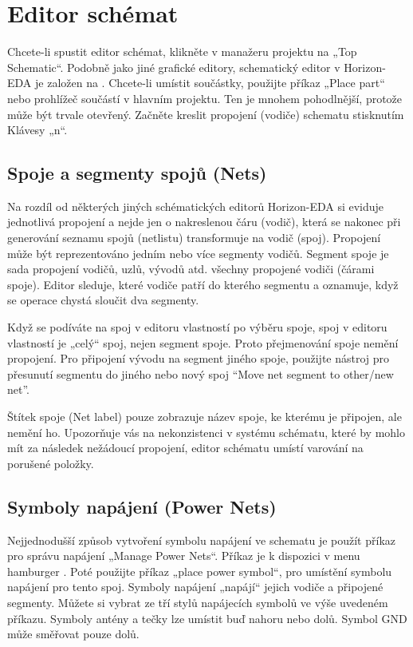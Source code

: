 \documentclass[letterpaper,10pt,czech]{sphinxmanual}
\let\sphinxpxdimen\pdfpxdimen\else\newdimen\sphinxpxdimen
\begin{document}
\chapter{Editor schémat}
\label{\detokenize{imp-sch:editor-schemat}}\label{\detokenize{imp-sch::doc}}
Chcete-li spustit editor schémat, klikněte v manažeru projektu na „Top Schematic“. Podobně jako jiné grafické editory, schematický editor v Horizon-EDA je založen na . Chcete-li umístit součástky, použijte příkaz „Place part“ nebo prohlížeč součástí v hlavním projektu. Ten je mnohem pohodlnější, protože může být trvale otevřený. Začněte kreslit propojení (vodiče) schematu stisknutím Klávesy „n“.


\section{Spoje a segmenty spojů (Nets)}
\label{\detokenize{imp-sch:spoje-a-segmenty-spoju-nets}}
Na rozdíl od některých jiných schématických editorů Horizon-EDA si eviduje jednotlivá propojení a nejde jen o nakreslenou čáru (vodič), která se nakonec při generování seznamu spojů (netlistu) transformuje na vodič (spoj). Propojení může být reprezentováno jedním nebo více segmenty vodičů. Segment spoje je sada propojení vodičů, uzlů, vývodů atd. všechny propojené vodiči (čárami spoje). Editor sleduje, které vodiče patří do kterého segmentu a oznamuje, když se operace chystá sloučit dva segmenty.

Když se podíváte na spoj v editoru vlastností po výběru spoje, spoj v editoru vlastností je „celý“ spoj, nejen segment spoje. Proto přejmenování spoje nemění propojení. Pro připojení vývodu na segment jiného spoje, použijte nástroj pro přesunutí segmentu do jiného nebo nový spoj “Move net segment to other/new net”.

Štítek spoje (Net label) pouze zobrazuje název spoje, ke kterému je připojen, ale nemění ho. Upozorňuje vás na nekonzistenci v systému schématu, které by mohlo mít za následek nežádoucí propojení, editor schématu umístí varování na porušené položky.


\section{Symboly napájení (Power Nets)}
\label{\detokenize{imp-sch:symboly-napajeni-power-nets}}
Nejjednodušší způsob vytvoření symbolu napájení ve schematu je použít příkaz pro správu napájení „Manage Power Nets“. Příkaz je k dispozici v menu hamburger \sphinxincludegraphics[height=10\sphinxpxdimen]{{hamburger}.png}. Poté použijte příkaz „place power symbol“, pro umístění symbolu napájení pro tento spoj. Symboly napájení „napájí“ jejich vodiče a připojené segmenty. Můžete si vybrat ze tří stylů napájecích symbolů ve výše uvedeném příkazu. Symboly antény a tečky
lze umístit buď nahoru nebo dolů. Symbol GND může směřovat pouze dolů.
\end{document}
